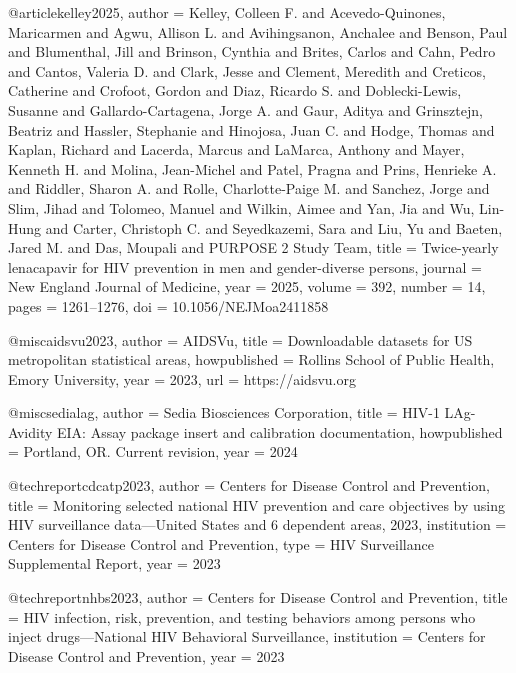@article{kelley2025,
  author  = {Kelley, Colleen F. and Acevedo-Quinones, Maricarmen and Agwu, Allison L. and Avihingsanon, Anchalee and Benson, Paul and Blumenthal, Jill and Brinson, Cynthia and Brites, Carlos and Cahn, Pedro and Cantos, Valeria D. and Clark, Jesse and Clement, Meredith and Creticos, Catherine and Crofoot, Gordon and Diaz, Ricardo S. and Doblecki-Lewis, Susanne and Gallardo-Cartagena, Jorge A. and Gaur, Aditya and Grinsztejn, Beatriz and Hassler, Stephanie and Hinojosa, Juan C. and Hodge, Thomas and Kaplan, Richard and Lacerda, Marcus and LaMarca, Anthony and Mayer, Kenneth H. and Molina, Jean-Michel and Patel, Pragna and Prins, Henrieke A. and Riddler, Sharon A. and Rolle, Charlotte-Paige M. and Sanchez, Jorge and Slim, Jihad and Tolomeo, Manuel and Wilkin, Aimee and Yan, Jia and Wu, Lin-Hung and Carter, Christoph C. and Seyedkazemi, Sara and Liu, Yu and Baeten, Jared M. and Das, Moupali and {PURPOSE 2 Study Team}},
  title   = {Twice-yearly lenacapavir for {HIV} prevention in men and gender-diverse persons},
  journal = {New England Journal of Medicine},
  year    = {2025},
  volume  = {392},
  number  = {14},
  pages   = {1261--1276},
  doi     = {10.1056/NEJMoa2411858}
}

@misc{aidsvu2023,
  author       = {{AIDSVu}},
  title        = {Downloadable datasets for {US} metropolitan statistical areas},
  howpublished = {Rollins School of Public Health, Emory University},
  year         = {2023},
  url          = {https://aidsvu.org}
}

@misc{sedialag,
  author       = {{Sedia Biosciences Corporation}},
  title        = {{HIV-1 LAg-Avidity EIA}: Assay package insert and calibration documentation},
  howpublished = {Portland, OR. Current revision},
  year         = {2024}
}

@techreport{cdcatp2023,
  author      = {{Centers for Disease Control and Prevention}},
  title       = {Monitoring selected national {HIV} prevention and care objectives by using {HIV} surveillance data---{United States} and 6 dependent areas, 2023},
  institution = {Centers for Disease Control and Prevention},
  type        = {{HIV} Surveillance Supplemental Report},
  year        = {2023}
}

@techreport{nhbs2023,
  author      = {{Centers for Disease Control and Prevention}},
  title       = {{HIV} infection, risk, prevention, and testing behaviors among persons who inject drugs---{National HIV Behavioral Surveillance}},
  institution = {Centers for Disease Control and Prevention},
  year        = {2023}
}

